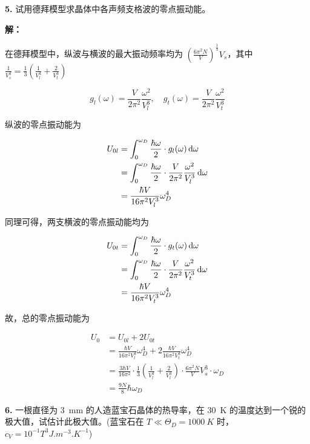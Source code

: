 \noindent \textbf{5.\quad} 试用德拜模型求晶体中各声频支格波的零点振动能。

\noindent \textbf{解：}

在德拜模型中，纵波与横波的最大振动频率均为 $\left(\frac{6 \pi^2 N}{V}\right)^{\frac{1}{3}} V_s$，其中 $\frac{1}{V_s^3}=\frac{1}{3} \left(\frac{1}{V_l^3}+\frac{2}{V_t^3}\right)$

\begin{equation*}
    g_l(\omega) = \frac{V}{2 \pi^2} \frac{\omega^2}{V_l^3}, \quad g_t(\omega) = \frac{V}{2 \pi^2} \frac{\omega^2}{V_t^3}
\end{equation*}

纵波的零点振动能为

\begin{align*}
    U_{0l} &= \int_0^{\omega_D} \frac{\hbar\omega}{2} \cdot g_l(\omega) \mathop{}\!\mathrm{d}\omega \\
    &= \int_0^{\omega_D} \frac{\hbar\omega}{2} \cdot \frac{V}{2\pi^2} \frac{\omega^2}{V_l^3} \mathop{}\!\mathrm{d}\omega \\
    &= \frac{\hbar V}{16 \pi^2 V_l^3} \omega_D^4
\end{align*}

同理可得，两支横波的零点振动能均为

\begin{align*}
    U_{0t} &= \int_0^{\omega_D} \frac{\hbar\omega}{2} \cdot g_t(\omega) \mathop{}\!\mathrm{d}\omega \\
    &= \int_0^{\omega_D} \frac{\hbar\omega}{2} \cdot \frac{V}{2\pi^2} \frac{\omega^2}{V_t^3} \mathop{}\!\mathrm{d}\omega \\
    &= \frac{\hbar V}{16 \pi^2 V_t^3} \omega_D^4
\end{align*}

故，总的零点振动能为

\begin{align*}
    U_0 &= U_{0l} + 2 U_{0t} \\
    &= \frac{\hbar V}{16 \pi^2 V_l^3} \omega_D^4 + 2 \frac{\hbar V}{16 \pi^2 V_t^3} \omega_D^4 \\
    &= \frac{3\hbar V}{16 \pi^2} \cdot \frac{1}{3} \left(\frac{1}{V_l^3}+\frac{2}{V_l^3}\right) \cdot \frac{6\pi^2 N}{V} V_s^3 \cdot \omega_D \\
    &= \frac{9N}{8} \hbar \omega_D
\end{align*}

\noindent \textbf{6.\quad} 一根直径为 \qty{3}{mm} 的人造蓝宝石晶体的热导率，在 \qty{30}{K} 的温度达到一个锐的极大值，试估计此极大值。(蓝宝石在 $T \ll \Theta_D = \qty{1000}{K}$ 时，$c_V=10^{-1} T^3 \unit{J.m^{-3}.K^{-1}}$)

